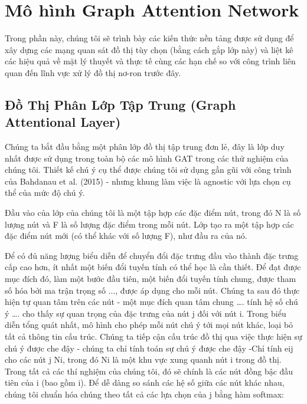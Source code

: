 \chapter{Mô hình Graph Attention Network}
\label{chap:gat-architecture}


Trong phần này, chúng tôi sẽ trình bày các kiến thức nền tảng được sử dụng để xây dựng các mạng quan sát đồ thị tùy chọn (bằng cách gắp lớp này) và liệt kê các hiệu quả về mặt lý thuyết và thực tế cùng các hạn chế so với công trình liên quan đến lĩnh vực xử lý đồ thị nơ-ron trước đây.




\section{Đồ Thị Phân Lớp Tập Trung (Graph Attentional Layer)}
Chúng ta bắt đầu bằng một phân lớp đồ thị tập trung đơn lẻ, đây là lớp duy nhất được sử dụng trong toàn bộ các mô hình GAT trong các thử nghiệm của chúng tôi. Thiết kế chú ý cụ thể được chúng tôi sử dụng gần gũi với công trình của Bahdanau et al. (2015) - nhưng khung làm việc là agnostic với lựa chọn cụ thể của mức độ chú ý.

Đầu vào của lớp của chúng tôi là một tập hợp các đặc điểm nút, trong đó N là số lượng nút và F là số lượng đặc điểm trong mỗi nút. Lớp tạo ra một tập hợp các đặc điểm nút mới (có thể khác với số lượng F), như đầu ra của nó.

Để có đủ năng lượng biểu diễn để chuyển đổi đặc trưng đầu vào thành đặc trưng cấp cao hơn, ít nhất một biến đổi tuyến tính có thể học là cần thiết. Để đạt được mục đích đó, làm một bước đầu tiên, một biến đổi tuyến tính chung, được tham số hóa bởi ma trận trọng số  ..., được áp dụng cho mỗi nút. Chúng ta sau đó thực hiện tự quan tâm trên các nút - một mục đích quan tâm chung …. tính hệ số chú ý
….
cho thấy sự quan trọng của đặc trưng của nút j đối với nút i. Trong biểu diễn tổng quát nhất, mô hình cho phép mỗi nút chú ý tới mọi nút khác, loại bỏ tất cả thông tin cấu trúc. Chúng ta tiếp cận cấu trúc đồ thị qua việc thực hiện sự chú ý được che đậy - chúng ta chỉ tính toán sự chú ý được che đậy -Chỉ tính eij cho các nút j  Ni, trong đó Ni là một khu vực xung quanh nút i trong đồ thị. Trong tất cả các thí nghiệm của chúng tôi, đó sẽ chính là các nút đồng bậc đầu tiên của i (bao gồm i). Để dễ dàng so sánh các hệ số giữa các nút khác nhau, chúng tôi chuẩn hóa chúng theo tất cả các lựa chọn của j bằng hàm softmax:

